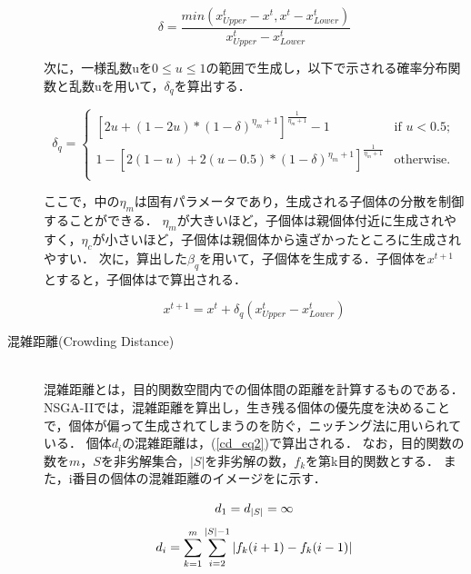 \documentclass[../main/main]{subfiles}
\begin{document}
\begin{description}
\begin{equation}
\delta=\frac{min(x^t_{Upper}-x^t,x^t-x^t_{Lower})}{x^t_{Upper}-x^t_{Lower}}
\label{pm_1}
\end{equation}

次に，一様乱数uを$0 \leq u \leq 1$の範囲で生成し，以下で示される確率分布関数と乱数uを用いて，$\delta_q$を算出する．

\begin{equation}
\delta_q=\begin{cases}
[2u+(1-2u)*(1-\delta)^{\eta_m+1}] ^{\frac {1}{\eta_m+1}}-1& \text{if \ $u<0.5;$} \\
1-[2(1-u)+2(u-0.5)*(1-\delta)^{\eta_m+1}] ^{\frac {1}{\eta_m+1}} & \text{otherwise.} \\
\end{cases}
\label{delta}
\end{equation}

ここで，中の$\eta_m$は固有パラメータであり，生成される子個体の分散を制御することができる．
$\eta_m$が大きいほど，子個体は親個体付近に生成されやすく，$\eta_c$が小さいほど，子個体は親個体から遠ざかったところに生成されやすい．
次に，算出した$\beta_q$を用いて，子個体を生成する．子個体を$x^{t+1}$とすると，子個体はで算出される．

\begin{equation}
x^{t+1}=x^t+\delta_q(x^t_{Upper}-x^t_{Lower})
\label{pm_2}
\end{equation}

\item[混雑距離(Crowding Distance)]\mbox{}\\
混雑距離とは，目的関数空間内での個体間の距離を計算するものである．
NSGA-IIでは，混雑距離を算出し，生き残る個体の優先度を決めることで，個体が偏って生成されてしまうのを防ぐ，ニッチング法に用いられている．
個体$d_i$の混雑距離は，(\ref{cd_eq2})で算出される．
なお，目的関数の数を$m$，$S$を非劣解集合，$|S|$を非劣解の数，$f_k$を第k目的関数とする．
また，i番目の個体の混雑距離のイメージをに示す．

\begin{equation}
d_1=d_{|S|}=\infty \\
\label{cd_eq1}
\end{equation}
\begin{equation}
d_i=\sum_{k=1}^m \sum_{i=2}^{|S|-1} |f_k(i+1)-f_k(i-1)|\\
\label{cd_eq2}
\end{equation}


\end{description}
\end{document}
